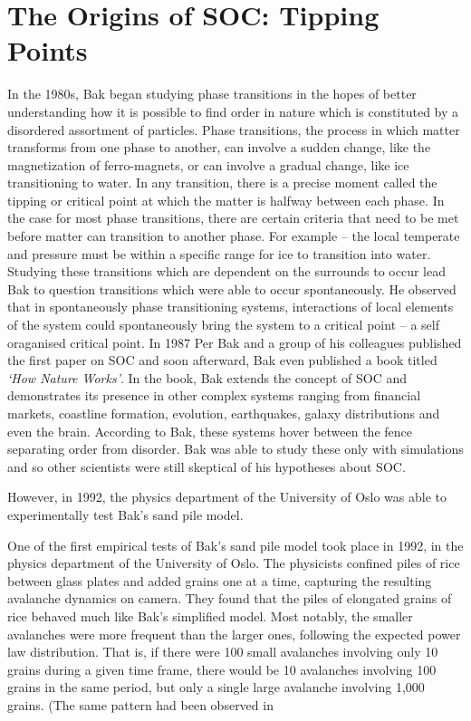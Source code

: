 \documentclass{book}
\begin{document}
\section{The Origins of SOC: Tipping Points}
In the 1980s, Bak began studying phase transitions in the hopes of better understanding how it is possible to find order in nature which is constituted by a disordered assortment of particles. Phase transitions, the process in which matter transforms from one phase to another, can involve a sudden change, like the magnetization of ferro-magnets, or can involve a gradual change, like ice transitioning to water. In any transition, there is a precise moment called the tipping or critical point at which the matter is halfway between each phase. In the case for most phase transitions, there are certain criteria that need to be met before matter can transition to another phase. For example -- the local temperate and pressure must be within a specific range for ice to transition into water. Studying these transitions which are dependent on the surrounds to occur lead Bak to question transitions which were able to occur spontaneously. He observed that in spontaneously phase transitioning systems, interactions of local elements of the system could spontaneously bring the system to a critical point -- a self oraganised critical point. 
In 1987 Per Bak and a group of his colleagues published the first paper on SOC and soon afterward, Bak even published a book titled \textit{`How Nature Works'}. In the book, Bak extends the concept of SOC and demonstrates its presence in other complex systems ranging from financial markets,  coastline formation, evolution, earthquakes, galaxy distributions and even the brain. According to Bak, these systems hover between the fence separating order from disorder. Bak was able to study these only with simulations and so other scientists were still skeptical of his hypotheses about SOC.

However, in 1992, the physics department of the University of Oslo was able to experimentally test Bak's sand pile model.

One of the first empirical tests of Bak’s sand pile model took place in 1992, in the physics department of the University of Oslo. The physicists confined piles of rice between glass plates and added grains one at a time, capturing the resulting avalanche dynamics on camera. They found that the piles of elongated grains of rice behaved much like Bak’s simplified model.
Most notably, the smaller avalanches were more frequent than the larger ones, following the expected power law distribution. That is, if there were 100 small avalanches involving only 10 grains during a given time frame, there would be 10 avalanches involving 100 grains in the same period, but only a single large avalanche involving 1,000 grains. (The same pattern had been observed in
\end{document}
